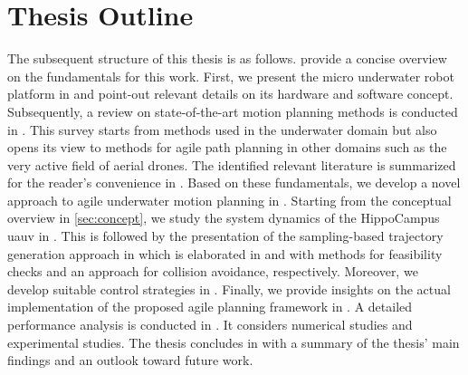 \section{Thesis Outline}
The subsequent structure of this thesis is as follows. 
 provide a concise overview on the fundamentals for this work.
First, we present the micro underwater robot platform in  and point-out relevant details on its hardware and software concept. 
Subsequently, a review on state-of-the-art motion planning methods is conducted in .
This survey starts from methods used in the underwater domain but also opens its view to methods for agile path planning in other domains such as the very active field of aerial drones.
The identified relevant literature is summarized for the reader's convenience in .
%
Based on these fundamentals, we develop a novel approach to agile underwater motion planning in . 
Starting from the conceptual overview in \cref{sec:concept}, we study the system dynamics of the HippoCampus \ac{uauv} in .
This is followed by the presentation of the sampling-based trajectory generation approach in  which is elaborated in    and   with methods for feasibility checks and an approach for collision avoidance, respectively.
Moreover, we develop suitable control strategies in .
Finally, we provide insights on the actual implementation of the proposed agile planning framework in .
%
A detailed performance analysis is conducted in . It considers numerical studies and experimental studies.
%
The thesis concludes in  with a summary of the thesis' main findings and an outlook toward future work.







